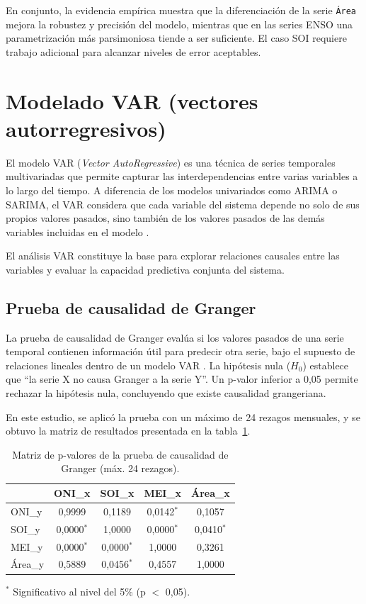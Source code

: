 En conjunto, la evidencia empírica muestra que la diferenciación de la serie \texttt{Área}
mejora la robustez y precisión del modelo, mientras que en las series ENSO una
parametrización más parsimoniosa tiende a ser suficiente. El caso SOI requiere trabajo
adicional para alcanzar niveles de error aceptables.

\section{Modelado VAR (vectores autorregresivos)}

El modelo VAR (\textit{Vector AutoRegressive}) es una técnica de series temporales multivariadas que permite capturar las interdependencias entre varias variables a lo largo del tiempo. A diferencia de los modelos univariados como ARIMA o SARIMA, el VAR considera que cada variable del sistema depende no solo de sus propios valores pasados, sino también de los valores pasados de las demás variables incluidas en el modelo \parencite{lutkepohl2005new}.

El análisis VAR constituye la base para explorar relaciones causales entre las variables y evaluar la capacidad predictiva conjunta del sistema.

\subsection{Prueba de causalidad de Granger}

La prueba de causalidad de Granger evalúa si los valores pasados de una serie temporal contienen información útil para predecir otra serie, bajo el supuesto de relaciones lineales dentro de un modelo VAR \parencite{granger1969investigating}.
La hipótesis nula (\(H_0\)) establece que “la serie X no causa Granger a la serie Y”. Un p-valor inferior a 0,05 permite rechazar la hipótesis nula, concluyendo que existe causalidad grangeriana.

En este estudio, se aplicó la prueba con un máximo de 24 rezagos mensuales, y se obtuvo la matriz de resultados presentada en la tabla~\ref{tab:granger_matrix}.

\begin{table}[H]
    \centering
    \caption{Matriz de p-valores de la prueba de causalidad de Granger (máx. 24 rezagos).}
    \label{tab:granger_matrix}
    \begin{tabular}{lcccc}
        \toprule
        & ONI\_x & SOI\_x & MEI\_x & Área\_x \\
        \midrule
        ONI\_y  & 0,9999   & 0,1189   & 0,0142$^{*}$ & 0,1057   \\
        SOI\_y  & 0,0000$^{*}$ & 1,0000   & 0,0000$^{*}$ & 0,0410$^{*}$ \\
        MEI\_y  & 0,0000$^{*}$ & 0,0000$^{*}$ & 1,0000   & 0,3261   \\
        Área\_y & 0,5889   & 0,0456$^{*}$ & 0,4557   & 1,0000   \\
        \bottomrule
    \end{tabular}
    \vspace{0.2cm}
    
    \raggedright \footnotesize{$^{*}$ Significativo al nivel del 5\% (p $<$ 0,05).}
\end{table}


